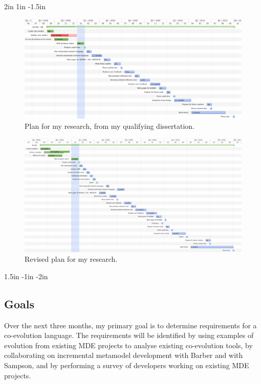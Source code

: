 \clearpage
\addtolength{\textwidth} {2in}
\addtolength{\topmargin} {1in}
\addtolength{\oddsidemargin} {-1.5in}
\begin{landscape}


\begin{figure}[ht]
  \begin{center}
    \leavevmode
    \includegraphics[scale=0.6]{old_plan.png}
  \end{center}
  \caption{Plan for my research, from my qualifying dissertation.}
  \label{fig:old_plan}
\end{figure}

\begin{figure}[ht]
  \begin{center}
    \leavevmode
    \includegraphics[scale=0.55]{revised_plan.png}
  \end{center}
  \caption{Revised plan for my research.}
  \label{fig:revised_plan}
\end{figure}

\end{landscape}
\addtolength{\oddsidemargin} {1.5in}
\addtolength{\topmargin} {-1in}
\addtolength{\textwidth} {-2in}

\subsection{Goals} %
\label{sub:goals}
Over the next three months, my primary goal is to determine requirements for a co-evolution language. The requirements will be identified by using examples of evolution from existing MDE projects to analyse existing co-evolution tools, by collaborating on incremental metamodel development with Barber and with Sampson, and by performing a survey of developers working on existing MDE projects.


